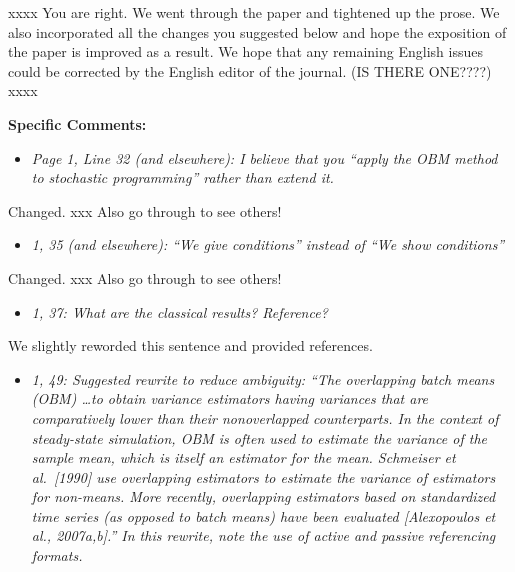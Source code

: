 \documentclass[11pt,notitlepage,onecolumn]{article}
\newcommand{\noi}{\noindent}
\begin{document}
\noindent  
xxxx
You are right. 
We went through the paper and tightened up the prose. 
We also incorporated all the changes you suggested below and hope the exposition of the paper is improved as a result.
We hope that any remaining English issues could be corrected by the English editor of the journal. (IS THERE ONE????) 
xxxx
\medskip 

\bigskip 


\noi  
{\large \bf Specific Comments:}
\medskip 


\begin{itemize}
\item[] \textit{Page 1, Line 32 (and elsewhere): I believe that you ``apply the OBM method to stochastic programming'' rather than extend it.}
\end{itemize}

\noi
Changed.  xxx Also go through to see others! 
\medskip 



\begin{itemize}
\item[] \textit{1, 35 (and elsewhere): ``We give conditions'' instead of ``We show conditions''}
\end{itemize}

\noi
Changed. xxx Also go through to see others!
\medskip 


\begin{itemize}
\item[] \textit{1, 37: What are the classical results? Reference?}
\end{itemize}

\noi
We slightly reworded this sentence and provided references.   
\medskip 



\begin{itemize}
\item[] \textit{1, 49: Suggested rewrite to reduce ambiguity: ``The overlapping batch means (OBM) \ldots to obtain variance estimators having variances that are comparatively lower than their nonoverlapped counterparts. 
In the context of steady-state simulation, OBM is often used to estimate the variance of the sample mean, which is itself an estimator for the mean. 
Schmeiser et al.\ [1990] use overlapping estimators to estimate the
variance of estimators for non-means. 
More recently, overlapping estimators based on standardized time series (as opposed to batch means) have been evaluated [Alexopoulos et al., 2007a,b].'' 
In this rewrite, note the use of active and passive referencing formats.}
\end{itemize}
\end{document}

